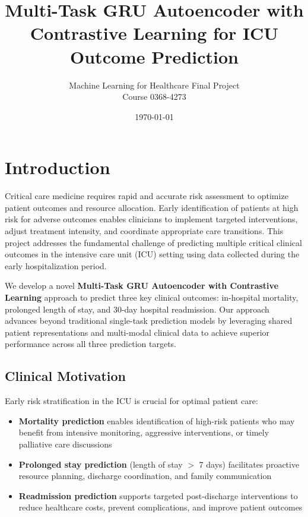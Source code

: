 \documentclass[11pt]{article}
\title{Multi-Task GRU Autoencoder with Contrastive Learning for ICU Outcome Prediction}
\author{Machine Learning for Healthcare Final Project\\
Course 0368-4273}
\date{\today}
\begin{document}
\maketitle

\section{Introduction}

Critical care medicine requires rapid and accurate risk assessment to optimize patient outcomes and resource allocation. Early identification of patients at high risk for adverse outcomes enables clinicians to implement targeted interventions, adjust treatment intensity, and coordinate appropriate care transitions. This project addresses the fundamental challenge of predicting multiple critical clinical outcomes in the intensive care unit (ICU) setting using data collected during the early hospitalization period.

We develop a novel \textbf{Multi-Task GRU Autoencoder with Contrastive Learning} approach to predict three key clinical outcomes: in-hospital mortality, prolonged length of stay, and 30-day hospital readmission. Our approach advances beyond traditional single-task prediction models by leveraging shared patient representations and multi-modal clinical data to achieve superior performance across all three prediction targets.

\subsection{Clinical Motivation}

Early risk stratification in the ICU is crucial for optimal patient care:

\begin{itemize}
    \item \textbf{Mortality prediction} enables identification of high-risk patients who may benefit from intensive monitoring, aggressive interventions, or timely palliative care discussions
    \item \textbf{Prolonged stay prediction} (length of stay $>$ 7 days) facilitates proactive resource planning, discharge coordination, and family communication
    \item \textbf{Readmission prediction} supports targeted post-discharge interventions to reduce healthcare costs, prevent complications, and improve patient outcomes
\end{itemize}
\end{document}
